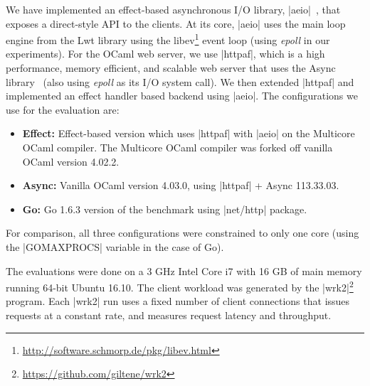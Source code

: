 \documentclass{llncs}
\begin{document}
We have implemented an effect-based asynchronous I/O library,
|aeio|~\citep*{aeio}, that exposes a direct-style API to the clients. At its
core, |aeio| uses the main loop engine from the Lwt library using the
libev\footnote{\url{http://software.schmorp.de/pkg/libev.html}} event loop
(using {\em epoll} in our experiments). For the OCaml web server, we use
|httpaf|, which is a high performance, memory efficient, and scalable web
server that uses the Async library~\citep*{Minsky13} (also using {\em epoll} as
its I/O system call). We then extended |httpaf| and implemented an effect
handler based backend using |aeio|. The configurations we use for the
evaluation are:

\begin{itemize}
	\item {\bf Effect:} Effect-based version which uses |httpaf| with |aeio| on
		the Multicore OCaml compiler. The Multicore OCaml compiler was
		forked off vanilla OCaml version 4.02.2.
	\item {\bf Async:} Vanilla OCaml version 4.03.0, using |httpaf| + Async 113.33.03.
	\item {\bf Go:} Go 1.6.3 version of the benchmark using |net/http| package.
\end{itemize}
For comparison, all three configurations were constrained to only one
core (using the |GOMAXPROCS| variable in the case of Go).

The evaluations were done on a 3 GHz Intel Core i7 with 16 GB of main memory
running 64-bit Ubuntu 16.10. The client workload was generated by the
|wrk2|\footnote{\url{https://github.com/giltene/wrk2}} program. Each |wrk2| run
uses a fixed number of client connections that issues requests at a
constant rate, and measures request latency and throughput.
\end{document}
